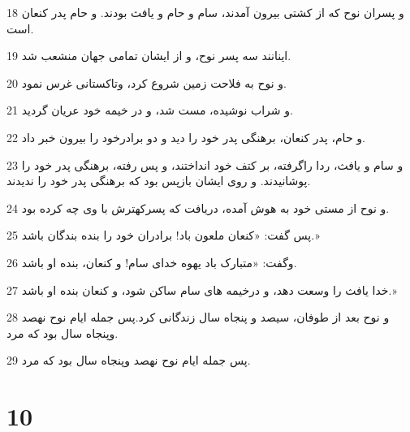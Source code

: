 \par 18 و پسران نوح که از کشتی بیرون آمدند، سام و حام و یافث بودند. و حام پدر کنعان است.
\par 19 اینانند سه پسر نوح، و از ایشان تمامی جهان منشعب شد.
\par 20 و نوح به فلاحت زمین شروع کرد، وتاکستانی غرس نمود.
\par 21 و شراب نوشیده، مست شد، و در خیمه خود عریان گردید.
\par 22 و حام، پدر کنعان، برهنگی پدر خود را دید و دو برادرخود را بیرون خبر داد.
\par 23 و سام و یافث، ردا راگرفته، بر کتف خود انداختند، و پس رفته، برهنگی پدر خود را پوشانیدند. و روی ایشان بازپس بود که برهنگی پدر خود را ندیدند.
\par 24 و نوح از مستی خود به هوش آمده، دریافت که پسرکهترش با وی چه کرده بود.
\par 25 پس گفت: «کنعان ملعون باد! برادران خود را بنده بندگان باشد.»
\par 26 وگفت: «متبارک باد یهوه خدای سام! و کنعان، بنده او باشد.
\par 27 خدا یافث را وسعت دهد، و درخیمه های سام ساکن شود، و کنعان بنده او باشد.»
\par 28 و نوح بعد از طوفان، سیصد و پنجاه سال زندگانی کرد.پس جمله ایام نوح نهصد وپنجاه سال بود که مرد.
\par 29 پس جمله ایام نوح نهصد وپنجاه سال بود که مرد.
 
\chapter{10}

